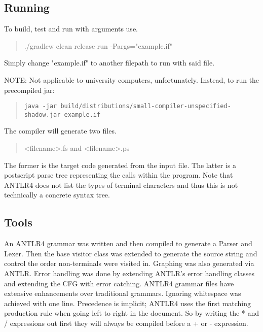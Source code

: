 \documentclass[a4paper,12pt]{article}
\begin{document}
\begin{landscape}
\subsection{Running}
To build, test and run with arguments use.
\begin{quotation}
./gradlew clean release run -Pargs="example.if"
\end{quotation}
Simply change "example.if" to another filepath to run with said file.

NOTE: Not applicable to university computers, unfortunately. Instead, to run the precompiled jar:


\begin{quotation}
\begin{verbatim}
java -jar build/distributions/small-compiler-unspecified-shadow.jar example.if
\end{verbatim}

\end{quotation}

The compiler will generate two files.
\begin{quotation}
<filename>.fs and <filename>.ps
\end{quotation}
The former is the target code generated from the input file. The latter is a postscript parse tree representing the calls within the program. Note that ANTLR4 does not list the types of terminal characters and thus this is not technically a concrete syntax tree.

\end{landscape}
\subsection{Tools}
An ANTLR4 grammar was written and then compiled to generate a Parser and Lexer. Then the base visitor class was extended to generate the source string and control the order non-terminals were visited in. Graphing was also generated via ANTLR. Error handling was done by extending ANTLR's error handling classes and extending the \gls{CFG} with error catching. ANTLR4 grammar files have extensive enhancements over traditional grammars. Ignoring whitespace was achieved with one
line. Precedence is implicit; ANTLR4 uses the first matching production rule when going left to right in the document. So by writing the * and / expressions out first they will always be compiled before a + or - expression.
\end{document}
